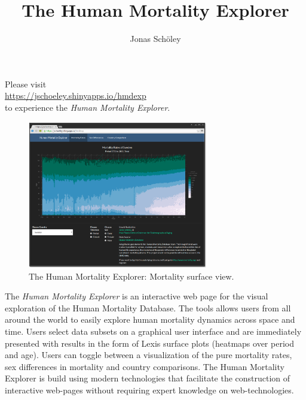 \documentclass[
  12pt
]{scrartcl}
\title{The Human Mortality Explorer}
\subtitle{An Interactive Online Visualization \vskip 0.2em of the Human Mortality Database}
\author{Jonas Schöley}
\begin{document}
\maketitle

\begin{center}
  {\Large\color{PineGreen} Please visit\\\url{https://jschoeley.shinyapps.io/hmdexp}\\to experience the \emph{Human Mortality Explorer}.}
\end{center}

\begin{figure}[ht!]
  \centering
  \includegraphics[width = 0.7\textwidth]{./fig/hmd_screen_mx.png}
  \caption{The Human Mortality Explorer: Mortality surface view.}
  \label{fig:mx}
\end{figure}

\begin{abstract2}
  The \emph{Human Mortality Explorer} is an interactive web page for the visual exploration of the Human Mortality Database. The tools allows users from all around the world to easily explore human mortality dynamics across space and time. Users select data subsets on a graphical user interface and are immediately presented with results in the form of Lexis surface plots (heatmaps over period and age). Users can toggle between a visualization of the pure mortality rates, sex differences in mortality and country comparisons. The Human Mortality Explorer is build using modern technologies that facilitate the construction of interactive web-pages without requiring expert knowledge on web-technologies.
\end{abstract2}

\clearpage

\end{document}
